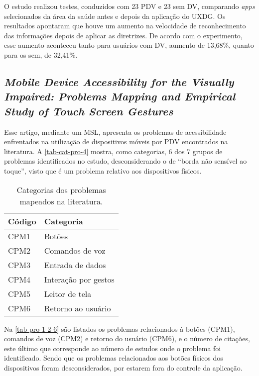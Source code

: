 O estudo realizou testes, conduzidos com 23 PDV e 23 sem DV, comparando \emph{apps} selecionados da área da saúde antes e depois da aplicação do UXDG\@.
Os resultados apontaram que houve um aumento na velocidade de reconhecimento das informações depois de aplicar as diretrizes.
De acordo com o experimento, esse aumento aconteceu tanto para usuários com DV, aumento de 13,68\%, quanto para os sem, de 32,41\%.

\subsection{\emph{Mobile Device Accessibility for the Visually Impaired: Problems Mapping and Empirical Study of Touch Screen Gestures}}

Esse artigo, mediante um MSL, apresenta os problemas de acessibilidade enfrentados na utilização de dispositivos móveis por PDV encontrados na literatura.
A \autoref{tab-cat-pro-4} mostra, como categorias, 6 dos 7 grupos de problemas identificados no estudo,
desconsiderando o de ``borda não sensível ao toque'', visto que é um problema relativo aos dispositivos físicos.

\begin{table}[htb]
  \begin{center}
    \ABNTEXfontereduzida
    \caption{Categorias dos problemas mapeados na literatura.}
    \label{tab-cat-pro-4}
    \begin{tabular}{p{2.0cm}|p{5.0cm}}
      \textbf{Código} & \textbf{Categoria}   \\
      \hline
      CPM1            & Botões               \\
      \hline
      CPM2            & Comandos de voz      \\
      \hline
      CPM3            & Entrada de dados     \\
      \hline
      CPM4            & Interação por gestos \\
      \hline
      CPM5            & Leitor de tela       \\
      \hline
      CPM6            & Retorno ao usuário   \\
    \end{tabular}
  \end{center}
\end{table}

Na \autoref{tab-pro-1-2-6} são listados os problemas relacionados à botões (CPM1), comandos de voz (CPM2) e retorno do usuário (CPM6),
e o número de citações, este último que corresponde ao número de estudos onde o problema foi identificado. Sendo que os problemas
relacionados aos botões físicos dos dispositivos foram desconsiderados, por estarem fora do controle da aplicação.

